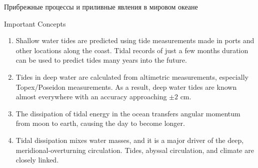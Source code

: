 \begin{chapter}{Прибрежные процессы и приливные явления в мировом океане}
\begin{section}{Important Concepts}
\begin{enumerate}
\item 
Shallow water tides are predicted using tide measurements made in
ports and other locations along the coast. Tidal records of just a few
months duration can be used to predict tides many years into the
future.
%

\item 
Tides in deep water are calculated from altimetric measurements,
especially Topex/Poseidon measurements. As a
result, deep water tides are known almost everywhere with an
accuracy approaching $\pm 2$ cm.
%

\item 
The dissipation of tidal energy in the ocean transfers angular
momentum from moon to earth, causing the day to become
longer.
%

\item 
Tidal dissipation mixes water masses, and it is a major driver of the
deep, meridional-overturning circulation. Tides, abyssal circulation, and climate are closely
linked.
%
\end{enumerate}
\end{section}
\end{chapter}